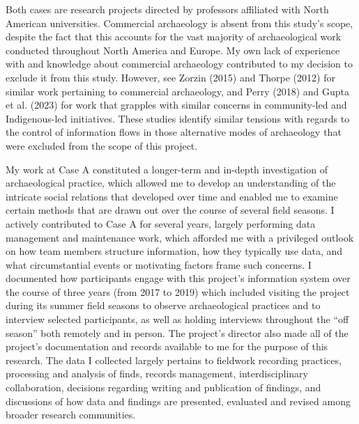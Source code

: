 \documentclass[
]{article}
\begin{document}
Both cases are research projects directed by professors affiliated with
North American universities. Commercial archaeology is absent from this
study's scope, despite the fact that this accounts for the vast majority
of archaeological work conducted throughout North America and Europe. My
own lack of experience with and knowledge about commercial archaeology
contributed to my decision to exclude it from this study. However, see
Zorzin (2015) and Thorpe (2012) for similar work pertaining to
commercial archaeology, and Perry (2018) and Gupta et al. (2023) for
work that grapples with similar concerns in community-led and
Indigenous-led initiatives. These studies identify similar tensions with
regards to the control of information flows in those alternative modes
of archaeology that were excluded from the scope of this project.

My work at Case A constituted a longer-term and in-depth investigation
of archaeological practice, which allowed me to develop an understanding
of the intricate social relations that developed over time and enabled
me to examine certain methods that are drawn out over the course of
several field seasons. I actively contributed to Case A for several
years, largely performing data management and maintenance work, which
afforded me with a privileged outlook on how team members structure
information, how they typically use data, and what circumstantial events
or motivating factors frame such concerns. I documented how participants
engage with this project's information system over the course of three
years (from 2017 to 2019) which included visiting the project during its
summer field seasons to observe archaeological practices and to
interview selected participants, as well as holding interviews
throughout the ``off season'' both remotely and in person. The project's
director also made all of the project's documentation and records
available to me for the purpose of this research. The data I collected
largely pertains to fieldwork recording practices, processing and
analysis of finds, records management, interdisciplinary collaboration,
decisions regarding writing and publication of findings, and discussions
of how data and findings are presented, evaluated and revised among
broader research communities.
\end{document}
